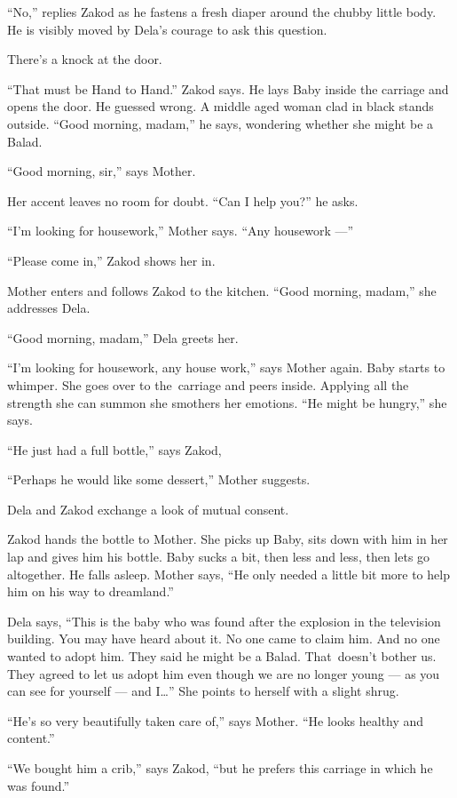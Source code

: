 \documentclass[twoside,11pt,openany]{book}
\begin{document}
``No,'' replies Zakod as he fastens a fresh diaper around the chubby little body. He is
visibly moved by Dela's courage to ask this question.

There's a knock at the door.

``That must be Hand to Hand.'' Zakod says. He lays Baby inside the carriage  and opens the door. He
guessed wrong. A middle aged woman clad in black stands outside.
``Good morning, madam,'' he says, wondering whether she might be a Balad.

``Good morning, sir,'' says Mother.

Her accent leaves no room for doubt. ``Can I help you?'' he asks.

``I'm looking for housework,'' Mother says. ``Any housework ---''

``Please come in,'' Zakod shows her in.

Mother enters and follows Zakod to the kitchen. ``Good morning, madam,'' she addresses Dela.

``Good morning,  madam,'' Dela greets her.

``I'm looking for housework, any house work,'' says Mother again.  Baby starts to whimper.
She goes over to the~carriage and peers inside. Applying all the strength she can summon she smothers her emotions.
``He might be hungry,'' she says.

``He just had a full bottle,'' says Zakod,

``Perhaps he would like some dessert,'' Mother suggests.

Dela and Zakod exchange a look of mutual consent.

Zakod hands the bottle to Mother. She picks up Baby, sits down with him in her lap and gives him his bottle. Baby sucks
a bit, then less and less, then lets go altogether. He falls asleep. Mother says, ``He only needed a
little bit more to help him on his way to dreamland.''

Dela says, ``This is the baby who was found after the explosion in the television building. You may have
heard about it. No one came to claim him. And no one wanted to adopt him. They said he might be a Balad. That~doesn't
bother us. They agreed to let us adopt him even though we are no longer young --- as you can see for yourself --- and I{\ldots}'' She points to herself with a slight shrug.

``He's so very beautifully taken care of,'' says Mother. ``He looks healthy and
content.''

``We bought him a crib,'' says Zakod, ``but he prefers this carriage in which he
was found.''
\end{document}
